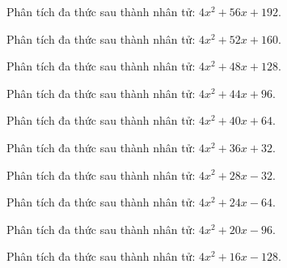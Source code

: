 \begin{bt}
	Phân tích đa thức sau thành nhân tử: $4 x^2 + 56 x + 192$.
\end{bt}
\begin{bt}
	Phân tích đa thức sau thành nhân tử: $4 x^2 + 52 x + 160$.
\end{bt}
\begin{bt}
	Phân tích đa thức sau thành nhân tử: $4 x^2 + 48 x + 128$.
\end{bt}
\begin{bt}
	Phân tích đa thức sau thành nhân tử: $4 x^2 + 44 x + 96$.
\end{bt}
\begin{bt}
	Phân tích đa thức sau thành nhân tử: $4 x^2 + 40 x + 64$.
\end{bt}
\begin{bt}
	Phân tích đa thức sau thành nhân tử: $4 x^2 + 36 x + 32$.
\end{bt}
\begin{bt}
	Phân tích đa thức sau thành nhân tử: $4 x^2 + 28 x - 32$.
\end{bt}
\begin{bt}
	Phân tích đa thức sau thành nhân tử: $4 x^2 + 24 x - 64$.
\end{bt}
\begin{bt}
	Phân tích đa thức sau thành nhân tử: $4 x^2 + 20 x - 96$.
\end{bt}
\begin{bt}
	Phân tích đa thức sau thành nhân tử: $4 x^2 + 16 x - 128$.
\end{bt}
